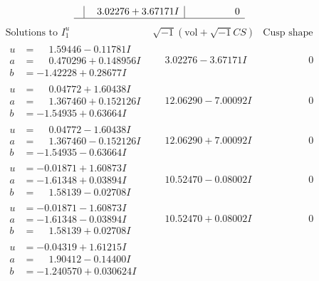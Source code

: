 \documentclass[1p]{elsarticle_modified}
\theoremstyle{definition}
\newcommand{\I}{\sqrt{-1}}
\begin{document}
$$\begin{array}{c|c|c}
 & \phantom{-}3.02276 + 3.67171 I & \phantom{-0.000000 } 0\\
 \hline 
 \end{array}$$\newpage$$\begin{array}{c|c|c}  
\text{Solutions to }I^u_{1}& \I (\text{vol} + \sqrt{-1}CS) & \text{Cusp shape}\\
 \hline 
\begin{aligned}
u &= \phantom{-}1.59446 - 0.11781 I \\
a &= \phantom{-}0.470296 + 0.148956 I \\
b &= -1.42228 + 0.28677 I\end{aligned}
 & \phantom{-}3.02276 - 3.67171 I & \phantom{-0.000000 } 0 \\ \hline\begin{aligned}
u &= \phantom{-}0.04772 + 1.60438 I \\
a &= \phantom{-}1.367460 + 0.152126 I \\
b &= -1.54935 + 0.63664 I\end{aligned}
 & \phantom{-}12.06290 - 7.00092 I & \phantom{-0.000000 } 0 \\ \hline\begin{aligned}
u &= \phantom{-}0.04772 - 1.60438 I \\
a &= \phantom{-}1.367460 - 0.152126 I \\
b &= -1.54935 - 0.63664 I\end{aligned}
 & \phantom{-}12.06290 + 7.00092 I & \phantom{-0.000000 } 0 \\ \hline\begin{aligned}
u &= -0.01871 + 1.60873 I \\
a &= -1.61348 + 0.03894 I \\
b &= \phantom{-}1.58139 - 0.02708 I\end{aligned}
 & \phantom{-}10.52470 - 0.08002 I & \phantom{-0.000000 } 0 \\ \hline\begin{aligned}
u &= -0.01871 - 1.60873 I \\
a &= -1.61348 - 0.03894 I \\
b &= \phantom{-}1.58139 + 0.02708 I\end{aligned}
 & \phantom{-}10.52470 + 0.08002 I & \phantom{-0.000000 } 0 \\ \hline\begin{aligned}
u &= -0.04319 + 1.61215 I \\
a &= \phantom{-}1.90412 - 0.14400 I \\
b &= -1.240570 + 0.030624 I\end{aligned}

\end{array}$$
\end{document}
